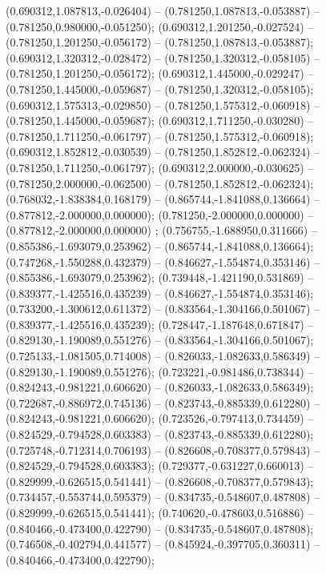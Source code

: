  (0.690312,1.087813,-0.026404) -- (0.781250,1.087813,-0.053887) -- (0.781250,0.980000,-0.051250);
 (0.690312,1.201250,-0.027524) -- (0.781250,1.201250,-0.056172) -- (0.781250,1.087813,-0.053887);
 (0.690312,1.320312,-0.028472) -- (0.781250,1.320312,-0.058105) -- (0.781250,1.201250,-0.056172);
 (0.690312,1.445000,-0.029247) -- (0.781250,1.445000,-0.059687) -- (0.781250,1.320312,-0.058105);
 (0.690312,1.575313,-0.029850) -- (0.781250,1.575312,-0.060918) -- (0.781250,1.445000,-0.059687);
 (0.690312,1.711250,-0.030280) -- (0.781250,1.711250,-0.061797) -- (0.781250,1.575312,-0.060918);
 (0.690312,1.852812,-0.030539) -- (0.781250,1.852812,-0.062324) -- (0.781250,1.711250,-0.061797);
 (0.690312,2.000000,-0.030625) -- (0.781250,2.000000,-0.062500) -- (0.781250,1.852812,-0.062324);
 (0.768032,-1.838384,0.168179) -- (0.865744,-1.841088,0.136664) -- (0.877812,-2.000000,0.000000);
 (0.781250,-2.000000,0.000000) -- (0.877812,-2.000000,0.000000) ;
 (0.756755,-1.688950,0.311666) -- (0.855386,-1.693079,0.253962) -- (0.865744,-1.841088,0.136664);
 (0.747268,-1.550288,0.432379) -- (0.846627,-1.554874,0.353146) -- (0.855386,-1.693079,0.253962);
 (0.739448,-1.421190,0.531869) -- (0.839377,-1.425516,0.435239) -- (0.846627,-1.554874,0.353146);
 (0.733200,-1.300612,0.611372) -- (0.833564,-1.304166,0.501067) -- (0.839377,-1.425516,0.435239);
 (0.728447,-1.187648,0.671847) -- (0.829130,-1.190089,0.551276) -- (0.833564,-1.304166,0.501067);
 (0.725133,-1.081505,0.714008) -- (0.826033,-1.082633,0.586349) -- (0.829130,-1.190089,0.551276);
 (0.723221,-0.981486,0.738344) -- (0.824243,-0.981221,0.606620) -- (0.826033,-1.082633,0.586349);
 (0.722687,-0.886972,0.745136) -- (0.823743,-0.885339,0.612280) -- (0.824243,-0.981221,0.606620);
 (0.723526,-0.797413,0.734459) -- (0.824529,-0.794528,0.603383) -- (0.823743,-0.885339,0.612280);
 (0.725748,-0.712314,0.706193) -- (0.826608,-0.708377,0.579843) -- (0.824529,-0.794528,0.603383);
 (0.729377,-0.631227,0.660013) -- (0.829999,-0.626515,0.541441) -- (0.826608,-0.708377,0.579843);
 (0.734457,-0.553744,0.595379) -- (0.834735,-0.548607,0.487808) -- (0.829999,-0.626515,0.541441);
 (0.740620,-0.478603,0.516886) -- (0.840466,-0.473400,0.422790) -- (0.834735,-0.548607,0.487808);
 (0.746508,-0.402794,0.441577) -- (0.845924,-0.397705,0.360311) -- (0.840466,-0.473400,0.422790);
